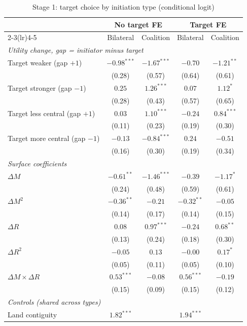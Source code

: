 \begin{table}[!htbp]\centering\small
\caption{Stage 1: target choice by initiation type (conditional logit)}\label{tab:stage1}
\begin{tabular}{lcccc}
\toprule
 & \multicolumn{2}{c}{No target FE} & \multicolumn{2}{c}{Target FE} \\
\cmidrule(lr){2-3}\cmidrule(lr){4-5}
 & Bilateral & Coalition & Bilateral & Coalition \\
\midrule
\multicolumn{5}{l}{\emph{Utility change, gap = initiator minus target}} \\
Target weaker (gap $+1$) & $-0.98^{***}$ & $-1.67^{***}$ & $-0.70$ & $-1.21^{**}$ \\
 & (0.28) & (0.57) & (0.64) & (0.61) \\
Target stronger (gap $-1$) & $0.25$ & $1.26^{***}$ & $0.07$ & $1.12^{*}$ \\
 & (0.28) & (0.43) & (0.57) & (0.65) \\
Target less central (gap $+1$) & $0.03$ & $1.10^{***}$ & $-0.24$ & $0.84^{***}$ \\
 & (0.11) & (0.23) & (0.19) & (0.30) \\
Target more central (gap $-1$) & $-0.13$ & $-0.84^{***}$ & $0.24$ & $-0.51$ \\
 & (0.16) & (0.30) & (0.19) & (0.34) \\
\midrule
\multicolumn{5}{l}{\emph{Surface coefficients}} \\
$\Delta M$ & $-0.61^{**}$ & $-1.46^{***}$ & $-0.39$ & $-1.17^{*}$ \\
 & (0.24) & (0.48) & (0.59) & (0.61) \\
$\Delta M^2$ & $-0.36^{**}$ & $-0.21$ & $-0.32^{**}$ & $-0.05$ \\
 & (0.14) & (0.17) & (0.14) & (0.15) \\
$\Delta R$ & $0.08$ & $0.97^{***}$ & $-0.24$ & $0.68^{**}$ \\
 & (0.13) & (0.24) & (0.18) & (0.30) \\
$\Delta R^2$ & $-0.05$ & $0.13$ & $-0.00$ & $0.17^{*}$ \\
 & (0.05) & (0.11) & (0.05) & (0.10) \\
$\Delta M \times \Delta R$ & $0.53^{***}$ & $-0.08$ & $0.56^{***}$ & $-0.19$ \\
 & (0.15) & (0.09) & (0.15) & (0.12) \\
\midrule
\multicolumn{5}{l}{\emph{Controls (shared across types)}} \\
Land contiguity & $1.82^{***}$ &  & $1.94^{***}$ &  \\

\end{tabular}
\end{table}
